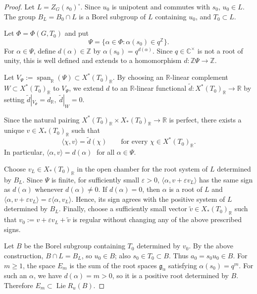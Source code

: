 \documentclass[11pt]{amsart}
\numberwithin{equation}{section}
\theoremstyle{definition}
\theoremstyle{remark}
\begin{document}
\begin{proof}
Let $L=Z_G(s_0)^\circ$.  Since $u_0$ is unipotent and commutes with $s_0$,
$u_0\in L$. The group $B_L=B_0\cap L$ is a Borel subgroup of $L$
containing $u_0$, and $T_0\subset L$.

Let $\Phi=\Phi(G,T_0)$ and put
\[
  \Psi=\{\alpha\in\Phi:\alpha(s_0)\in q^{\mathbb{Z}}\}.
\]
For $\alpha\in\Psi$, define $d(\alpha)\in\mathbb Z$ by $\alpha(s_0)=q^{d(\alpha)}.$ Since $q\in\mathbb C^\times$ is not a root of unity, this is well
defined and extends to a homomorphism $d:\mathbb Z\Psi\longrightarrow\mathbb Z.$

Let $V_{\Psi}:=\operatorname{span}_{\mathbb R}(\Psi)
  \subset X^*(T_0)_{\mathbb R}.$ 
By choosing an $\mathbb R$-linear complement $W\subset X^*(T_0)_{\mathbb R}$ to $V_\Psi$, we extend $d$ to an $\mathbb{R}$-linear functional
$\widetilde d:X^*(T_0)_{\mathbb R}\to\mathbb R$ by setting $\widetilde d|_{V_{\Psi}}=d_{\mathbb R},\; \widetilde d|_W=0.$

Since the natural pairing $X^*(T_0)_{\mathbb R}\times X_*(T_0)_{\mathbb R}
  \longrightarrow\mathbb R$ is perfect, there exists a unique $v\in X_*(T_0)_{\mathbb R}$ such that
\[
  \langle\chi,v\rangle=\widetilde d(\chi)
  \qquad
  \text{for every }\chi\in X^*(T_0)_{\mathbb R}.
\]
In particular, $ \langle\alpha,v\rangle=d(\alpha)
  \;$ for all $\alpha\in\Psi.$

Choose $v_L\in X_*(T_0)_{\mathbb{R}}$ in the open chamber for the root system of $L$ determined by
$B_L$. Since $\Psi$ is finite, for
sufficiently small $\varepsilon>0$, 
$\langle\alpha,v+\varepsilon v_L\rangle$ has the same sign as $d(\alpha)$ whenever $d(\alpha)\neq0$.
If $d(\alpha)=0$, then $\alpha$ is a root of $L$ and $\langle\alpha,v+\varepsilon v_L\rangle
  =\varepsilon\langle\alpha,v_L\rangle.$
Hence, its sign agrees with the positive system of $L$ determined by
$B_L$. Finally, choose a
sufficiently small vector $\tilde{v}\in X_*(T_0)_{\mathbb{R}}$ such that $v_{0}:=v+\varepsilon v_L+\tilde{v}$ is regular without changing any of the above
prescribed signs.

Let $B$ be the Borel subgroup containing $T_0$ determined by $v_0$. By the above construction, $B\cap L=B_L$, so $u_0\in B$; also
$s_0\in T_0\subset B$.  Thus $a_0=s_0u_0\in B$.  For $m\geq1$, the space
$E_m$ is the sum of the root spaces $\mathfrak{g}_\alpha$ satisfying
$\alpha(s_0)=q^m$. For such an $\alpha$, we have $d(\alpha)=m>0$, so it is a positive root determined by
$B$. Therefore $E_m\subset\operatorname{Lie}R_u(B)$.
\end{proof}
\end{document}
